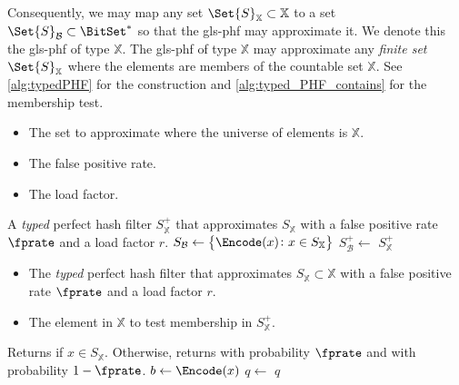 \documentclass[ ../main.tex]{subfiles}
\begin{document}
Consequently, we may map any set $\Set{S}_\mathbb{X} \subset \mathbb{X}$ to a set $\Set{S}_{\mathcal{B}} \subset \BitSet^*$ so that the \gls{gls-phf} may approximate it. We denote this the \gls{gls-phf} of type $\mathbb{X}$. The \gls{gls-phf} of type $\mathbb{X}$ may approximate any \emph{finite set} $\Set{S}_\mathbb{X}$ where the elements are members of the countable set $\mathbb{X}$. See \cref{alg:typedPHF} for the construction and \cref{alg:typed_PHF_contains} for the membership test.
\begin{algorithm}[h]
    \caption{Construction of the \emph{typed} Perfect Hash Filter}
    \label{alg:typedPHF}
    \KwIn
    {
        \begin{itemize}
            \item[$S_{\mathbb{X}}$] The set to approximate where the universe of elements is $\mathbb{X}$.
            \item[$\fprate$] The false positive rate.
            \item[$r$] The load factor.
        \end{itemize}
    }
    \KwOut
    {
        A \emph{typed} perfect hash filter $S^+_{\mathbb{X}}$ that approximates $S_{\mathbb{X}}$ with a false positive rate $\fprate$ and a load factor $r$.
    }
    {
        $S_{\mathcal{B}} \gets \left\{ \Encode(x) \colon x \in S_{\mathbb{X}}\right\}$\;
        $S^+_{\mathcal{B}} \gets$ \;
        \Return $S^+_{\mathbb{X}}$\;
    }
\end{algorithm}
\begin{algorithm}[h]
    \caption{Membership test for the \emph{typed} Perfect Hash Filter}
    \label{alg:typed_PHF_contains}
    \KwIn
    {
        \begin{itemize}
            \item[$S^+_{\mathbb{X}}$] The \emph{typed} perfect hash filter that approximates $S_{\mathbb{X}} \subset \mathbb{X}$ with a false positive rate $\fprate$ and a load factor $r$.
            \item[$x$] The element in $\mathbb{X}$ to test membership in $S^+_{\mathbb{X}}$.
        \end{itemize}
    }
    \KwOut
    {
        Returns \True if $x \in S_{\mathbb{X}}$. Otherwise, returns \True with probability $\fprate$ and \False with probability $1 - \fprate$.
    }
    {
        $b \gets \Encode(x)$\;
        $q \gets$ \;
        \Return $q$\;
    }
\end{algorithm}
\end{document}
